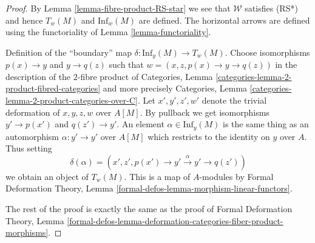 \documentclass[10pt,a4paper]{amsart}
\theoremstyle{plain}
\theoremstyle{definition}
\theoremstyle{remark}
\numberwithin{equation}{subsection}
\begin{document}
\begin{proof}
By Lemma \ref{lemma-fibre-product-RS-star} we see that $\mathcal{W}$
satisfies (RS*) and hence $T_w(M)$ and $\text{Inf}_w(M)$ are defined.
The horizontal arrows are defined using the functoriality of
Lemma \ref{lemma-functoriality}.

\medskip\noindent
Definition of the ``boundary'' map $\delta : \text{Inf}_y(M) \to T_w(M)$.
Choose isomorphisms $p(x) \to y$ and $y \to q(z)$ such that
$w = (x, z, p(x) \to y \to q(z))$ in the description of
the $2$-fibre product of
Categories, Lemma \ref{categories-lemma-2-product-fibred-categories}
and more precisely
Categories, Lemma \ref{categories-lemma-2-product-categories-over-C}.
Let $x', y', z', w'$ denote the trivial deformation of
$x, y, z, w$ over $A[M]$. By pullback we get isomorphisms
$y' \to p(x')$ and $q(z') \to y'$. An element $\alpha \in \text{Inf}_y(M)$
is the same thing as an automorphism $\alpha : y' \to y'$
over $A[M]$ which restricts to the identity on $y$ over $A$.
Thus setting
$$
\delta(\alpha) =
(x', z', p(x') \to y' \xrightarrow{\alpha} y' \to q(z'))
$$
we obtain an object of $T_w(M)$. This is a map of $A$-modules
by Formal Deformation Theory, Lemma
\ref{formal-defos-lemma-morphism-linear-functors}.

\medskip\noindent
The rest of the proof is exactly the same as the proof of
Formal Deformation Theory, Lemma
\ref{formal-defos-lemma-deformation-categories-fiber-product-morphisms}.
\end{proof}
\end{document}
